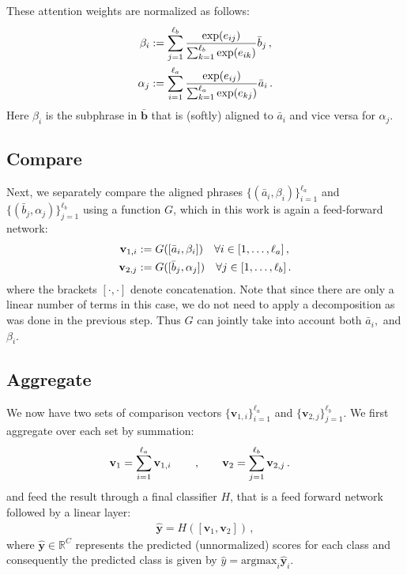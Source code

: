 \documentclass[11pt,letterpaper]{article}
\newcommand{\bb}{\mathbf{b}}
\newcommand{\vb}{\mathbf{v}}
\newcommand{\yhat}{\hat{y}}
\newcommand{\yb}{\mathbf{y}}
\newcommand{\RR}{\mathbb{R}}
\newcommand{\argmax}{\textrm{argmax}}
\begin{document}
These attention weights are normalized as follows:
\begin{align}\label{eq:normalized_attention}
\beta_i &:= \sum_{j=1}^{\ell_b} \frac{\exp(e_{ij})}{\sum_{k=1}^{\ell_b} \exp(e_{ik})} \bar{b}_j\,,  \notag \\
\alpha_j &:= \sum_{i=1}^{\ell_a} \frac{\exp(e_{ij})}{\sum_{k=1}^{\ell_a} \exp(e_{kj})} \bar{a}_i\,.
\end{align}
Here $\beta_i$ is the subphrase in $\bar{\bb}$ that is (softly) aligned to $\bar{a}_i$ and vice versa for $\alpha_j$.


\subsection{Compare}
Next, we separately compare the aligned phrases $\{(\bar{a}_i, \beta_i)\}_{i=1}^{\ell_a}$ and $\{(\bar{b}_j, \alpha_j)\}_{j=1}^{\ell_b}$ using a function $G$, which in this work is again a feed-forward network:
\begin{align}
\vb_{1,i} &:= G([\bar{a}_i, \beta_i])\quad \forall i \in [1,\ldots, \ell_a]\,, \notag \\
\vb_{2,j} &:= G([\bar{b}_j, \alpha_j])\quad \forall j \in [1,\ldots, \ell_b]\,.
\label{eq:gdefine}
\end{align}
where the brackets $[\cdot, \cdot]$ denote concatenation. Note that since there are only a linear number of terms in this case, we do not need to apply a decomposition as was done in the previous step. Thus $G$ can jointly take into account both $\bar{a}_i,$ and $\beta_i$.

\subsection{Aggregate}
We now have two sets of comparison vectors $\{\vb_{1,i}\}_{i=1}^{\ell_a}$ and $\{\vb_{2,j}\}_{j=1}^{\ell_b}$. We first aggregate over each set by summation:
\begin{align}
\vspace{-0.1cm}
\vb_{1} &= \sum_{i=1}^{\ell_a} \vb_{1,i} \qquad\,, \qquad \vb_{2} = \sum_{j=1}^{\ell_b}  \vb_{2,j}\,.
\vspace{-0.1cm}
\end{align}
and feed the result through a final classifier $H$, that is a feed forward network followed by a linear layer:
\begin{align}
\hat{\yb} = H([\vb_1, \vb_2])\,,
\label{eq:hdefine}
\end{align}
where $\hat{\yb} \in \RR^C$ represents the predicted (unnormalized) scores for each class and consequently the predicted class is given by $\yhat = \argmax_i \hat{\yb}_i$.
\end{document}
